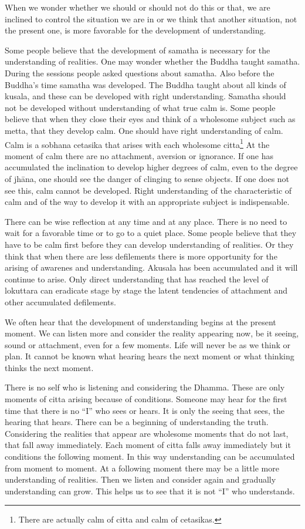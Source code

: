{When we wonder whether we should or should not do this or
that, we are inclined to control the situation we are in or we think
that another situation, not the present one, is more favorable for the
development of understanding. 

Some people believe that the development of samatha is
necessary for the understanding of realities. One may wonder whether the
Buddha taught 
samatha. During the sessions people asked questions about
samatha. Also before the Buddha's time samatha was developed. The Buddha
taught about all kinds of kusala, and these can be developed with right
understanding. Samatha should not be developed without understanding of
what true calm is. Some people believe that when they close their eyes
and think of a wholesome subject such as metta, that they develop calm.
One should have right understanding of calm. Calm is a sobhana cetasika
that arises with each wholesome citta\footnote{There are actually calm
of citta and calm of cetasikas.}
At the moment of calm there are no attachment, aversion or ignorance. If
one has accumulated the inclination to develop higher degrees of calm,
even to the degree of jhāna, one should see the danger of clinging to
sense objects. If one does not see this, calm cannot be developed. Right
understanding of the characteristic of calm and of the way to develop it
with an appropriate subject is indispensable. 

There can be wise reflection at any time and at any place.
There is no need to wait for a favorable time or to go to a quiet place.
Some people believe that they have to be calm first before they can
develop understanding of realities. Or they think that when there are
less defilements there is more opportunity for the arising of awarenes
and understanding. Akusala has been accumulated and it will continue to
arise. Only direct understanding that has reached the level of lokuttara
can eradicate stage by stage
the latent tendencies of attachment and other accumulated defilements. 

We often hear that the development of understanding begins at
the present moment. We can listen more and consider the reality
appearing now, be it seeing, sound or attachment, even for a few
moments. Life will never be as we think or plan. It cannot be known what
hearing hears the next moment or what thinking thinks the next moment.

There is no self who is listening and considering the Dhamma.
These are only moments of citta arising because of conditions. Someone
may hear for the first time that there is no ``I'' who sees or hears. It
is only the seeing that sees, the hearing that hears. There can be a
beginning of understanding the truth. Considering the realities that
appear are wholesome moments that do not last, that fall away
immediately. Each moment of citta falls away immediately but it
conditions the following moment. In this way understanding can be
accumulated from moment to moment. At a following moment there may be a
little more understanding of realities. Then we listen and consider
again and gradually understanding can grow. This helps us to see that it
is not ``I'' who understands. 

}
